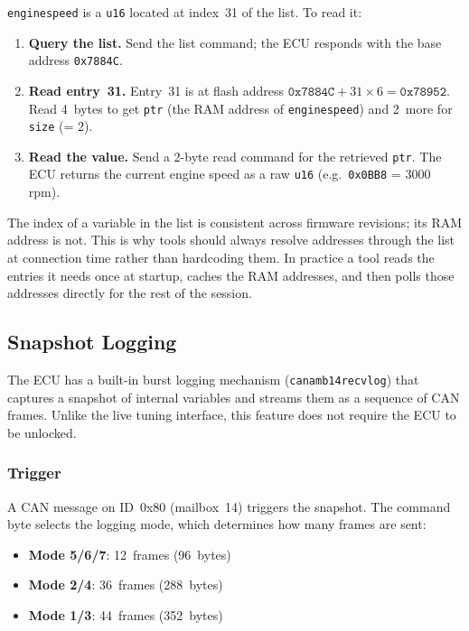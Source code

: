 \documentclass[a4paper,11pt]{article}
\renewcommand{\_}{\oldunderscore\allowbreak}
\begin{document}
\texttt{engine\_speed\_2} is a \texttt{u16} located at index~31 of the list.
To read it:

\begin{enumerate}
\item \textbf{Query the list.} Send the list command; the ECU responds with
      the base address \texttt{0x7884C}.
\item \textbf{Read entry~31.} Entry~31 is at flash address
      $\texttt{0x7884C} + 31 \times 6 = \texttt{0x78952}$. Read 4~bytes to
      get \texttt{ptr} (the RAM address of \texttt{engine\_speed\_2}) and
      2~more for \texttt{size} (= 2).
\item \textbf{Read the value.} Send a 2-byte read command for the retrieved
      \texttt{ptr}. The ECU returns the current engine speed as a raw
      \texttt{u16} (e.g.\ \texttt{0x0BB8} = 3000\,rpm).
\end{enumerate}

The index of a variable in the list is consistent across firmware revisions;
its RAM address is not. This is why tools should always resolve addresses
through the list at connection time rather than hardcoding them. In practice
a tool reads the entries it needs once at startup, caches the RAM addresses,
and then polls those addresses directly for the rest of the session.

\subsection{Snapshot Logging}

The ECU has a built-in burst logging mechanism
(\texttt{can\_a\_mb14\_recv\_log}) that captures a snapshot of internal
variables and streams them as a sequence of CAN frames. Unlike the live tuning
interface, this feature does not require the ECU to be unlocked.

\subsubsection*{Trigger}

A CAN message on ID~0x80 (mailbox~14) triggers the snapshot. The command
byte selects the logging mode, which determines how many frames are sent:

\begin{itemize}
\item \textbf{Mode 5/6/7}: 12~frames (96~bytes)
\item \textbf{Mode 2/4}: 36~frames (288~bytes)
\item \textbf{Mode 1/3}: 44~frames (352~bytes)
\end{itemize}
\end{document}
